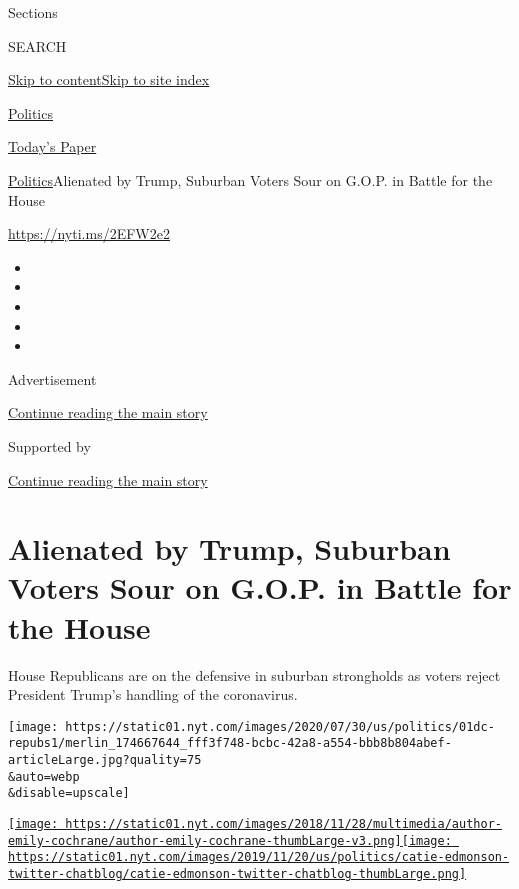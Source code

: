 Sections

SEARCH

\protect\hyperlink{site-content}{Skip to
content}\protect\hyperlink{site-index}{Skip to site index}

\href{https://www.nytimes.com/section/politics}{Politics}

\href{https://myaccount.nytimes.com/auth/login?response_type=cookie\&client_id=vi}{}

\href{https://www.nytimes.com/section/todayspaper}{Today's Paper}

\href{/section/politics}{Politics}\textbar{}Alienated by Trump, Suburban
Voters Sour on G.O.P. in Battle for the House

\url{https://nyti.ms/2EFW2e2}

\begin{itemize}
\item
\item
\item
\item
\item
\end{itemize}

Advertisement

\protect\hyperlink{after-top}{Continue reading the main story}

Supported by

\protect\hyperlink{after-sponsor}{Continue reading the main story}

\hypertarget{alienated-by-trump-suburban-voters-sour-on-gop-in-battle-for-the-house}{%
\section{Alienated by Trump, Suburban Voters Sour on G.O.P. in Battle
for the
House}\label{alienated-by-trump-suburban-voters-sour-on-gop-in-battle-for-the-house}}

House Republicans are on the defensive in suburban strongholds as voters
reject President Trump's handling of the coronavirus.

\texttt{[image: https://static01.nyt.com/images/2020/07/30/us/politics/01dc-repubs1/merlin\_174667644\_fff3f748-bcbc-42a8-a554-bbb8b804abef-articleLarge.jpg?quality=75\\\&auto=webp\\\&disable=upscale]}

\href{https://www.nytimes.com/by/emily-cochrane}{\texttt{[image: https://static01.nyt.com/images/2018/11/28/multimedia/author-emily-cochrane/author-emily-cochrane-thumbLarge-v3.png]}}\href{https://www.nytimes.com/by/catie-edmondson}{\texttt{[image: https://static01.nyt.com/images/2019/11/20/us/politics/catie-edmonson-twitter-chatblog/catie-edmonson-twitter-chatblog-thumbLarge.png]}}

